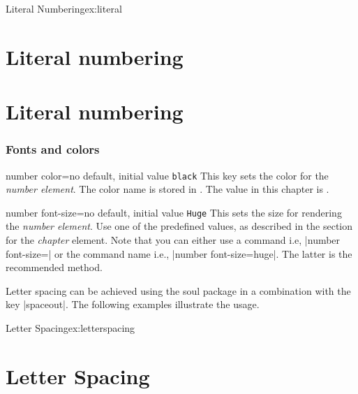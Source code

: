 
\begin{texexample}{Literal Numbering}{ex:literal}
\chapter{Literal numbering}
\lorem
{}
\chapter{Literal numbering} 
\lorem
\end{texexample}



\subsection{Fonts and colors}
\begin{docKey}[phd]{number color}{=}{no default, initial value \texttt{black}}
This key sets the color for the \textit{number element}. The color name is stored in \cmd{\numbercolor@cx}.
The value in this chapter is \makeatletter\texttt{\numbercolor@cx}\makeatother.
\end{docKey}

\begin{docKey}[phd]{number font-size}{=}{no default, initial value \texttt{Huge}}
This sets the size for rendering the \textit{number element}. Use one of the predefined values, as described
in the section for the \emph{chapter} element.
Note that you can either use a command i.e, |number font-size=|\cmd{\huge} 
or the command name i.e., |number font-size=huge|. The latter is the recommended method.
\end{docKey}

Letter spacing can be achieved using the soul package in a combination with the key |spaceout|.
The following examples illustrate the usage.

\begin{texexample}{Letter Spacing}{ex:letterspacing}
\chapter{Letter Spacing}

\lorem
\end{texexample}

